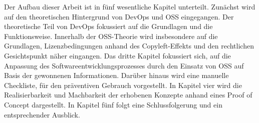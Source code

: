 Der Aufbau dieser Arbeit ist in fünf wesentliche Kapitel unterteilt. Zunächst wird auf den theoretischen Hintergrund von DevOps und OSS eingegangen. Der theoretische Teil von DevOps fokussiert auf die Grundlagen und die Funktionsweise. Innerhalb der OSS-Theorie wird insbesondere auf die Grundlagen, Lizenzbedingungen anhand des Copyleft-Effekts und den rechtlichen Gesichtspunkt näher eingangen. Das dritte Kapitel fokussiert sich, auf die Anpassung des Softwareentwicklungsprozesses durch den Einsatz von OSS auf Basis der gewonnenen Informationen. Darüber hinaus wird eine manuelle Checkliste, für den präventiven Gebrauch vorgestellt. In Kapitel vier wird die Realisierbarkeit und Machbarkeit der erhobenen Konzepte anhand eines Proof of Concept dargestellt. In Kapitel fünf folgt eine Schlussfolgerung und ein entsprechender Ausblick. 